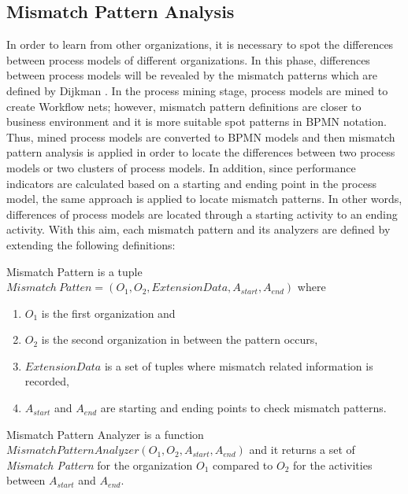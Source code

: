 \subsection{Mismatch Pattern Analysis}
\label{subsec:mismatch-pattern-analysis}
In order to learn from other organizations, it is necessary to spot the differences between process models of different organizations. In this phase, differences between process models will be revealed by the mismatch patterns which are defined by Dijkman \cite{dijkman2007mismatch}. In the process mining stage, process models are mined to create Workflow nets; however, mismatch pattern definitions are closer to business environment and it is more suitable spot patterns in BPMN notation. Thus, mined process models are converted to BPMN models and then mismatch pattern analysis is applied in order to locate the differences between two process models or two clusters of process models. In addition, since performance indicators are calculated based on a starting and ending point in the process model, the same approach is applied to locate mismatch patterns. In other words, differences of process models are located through a starting activity to an ending activity. With this aim, each mismatch pattern and its analyzers are defined by extending the following definitions:
\theoremstyle{definition}
    \begin{definition}
    Mismatch Pattern is a tuple ${Mismatch\ Patten} = (O_{1}, O_{2}, ExtensionData, A_{start}, A_{end}) $ where 
    \begin{enumerate}
      \item $O_{1}$ is the first organization and \item $O_{2}$ is the second organization in between the pattern occurs,
      \item $ExtensionData$ is a set of tuples where mismatch related information is recorded, 
      \item $A_{start}$ and $A_{end}$ are starting and ending points to check mismatch patterns.
    \end{enumerate}
    \end{definition}

    \theoremstyle{definition}
    \begin{definition}
    Mismatch Pattern Analyzer is a function $MismatchPatternAnalyzer(O_{1}, O_{2}, A_{start}, A_{end})$ and it returns a set of \textit{Mismatch Pattern} for the organization $O_{1}$ compared to $O_{2}$ for the activities between $A_{start}$ and $A_{end}$.
    \end{definition}

